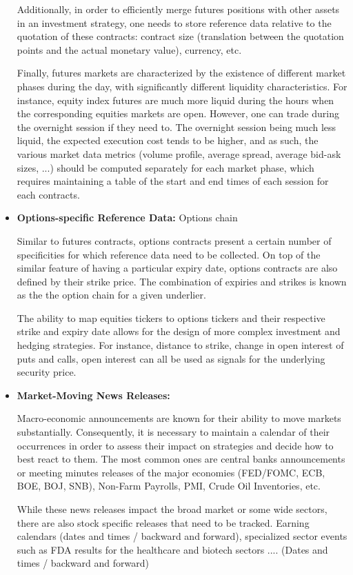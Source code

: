 \begin{itemize}
Additionally, in order to efficiently merge futures positions with other assets in an investment strategy, one needs to store reference data relative to the quotation of these contracts: contract size (translation between the quotation points and the actual monetary value), currency, etc. 

Finally, futures markets are characterized by the existence of different market phases during the day, with significantly different liquidity characteristics. For instance, equity index futures are much more liquid during the hours when the corresponding equities markets are open. However, one can trade during the overnight session if they need to. The overnight session being much less liquid, the expected execution cost tends to be higher, and as such, the various market data metrics (volume profile, average spread, average bid-ask sizes, ...) should be computed separately for each market phase, which requires maintaining a table of the start and end times of each session for each contracts. 

\item \textbf{Options-specific Reference Data:} Options chain

Similar to futures contracts, options contracts present a certain number of specificities for which reference data need to be collected. On top of the similar feature of having a particular expiry date, options contracts are also defined by their strike price. The combination of expiries and strikes is known as the the option chain for a given underlier. 

The ability to map equities tickers to options tickers and their respective strike and expiry date allows for the design of more complex investment and hedging strategies. For instance, distance to strike, change in open interest of puts and calls, open interest can all be used as signals for the underlying security price.

\item \textbf{Market-Moving News Releases:} 

Macro-economic announcements are known for their ability to move markets substantially. Consequently, it is necessary to maintain a calendar of their occurrences in order to assess their impact on strategies and decide how to best react to them. The most common ones are central banks announcements or meeting minutes releases of the major economies (FED/FOMC, ECB, BOE, BOJ, SNB), Non-Farm Payrolls, PMI, Crude Oil Inventories, etc.

While these news releases impact the broad market or some wide sectors, there are also stock specific releases that need to be tracked. 
Earning calendars (dates and times / backward and forward), specialized sector events such as FDA results for the healthcare and biotech sectors  .... (Dates and times / backward and forward)




\end{itemize}
